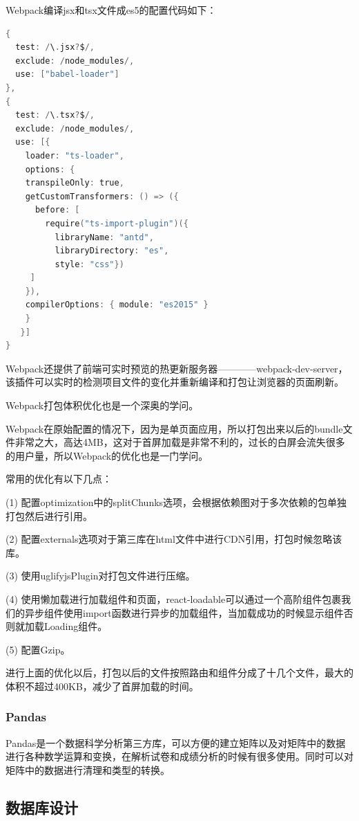 Webpack编译jsx和tsx文件成es5的配置代码如下：
\begin{lstlisting}[language=C]
{
  test: /\.jsx?$/,
  exclude: /node_modules/,
  use: ["babel-loader"]
},
{
  test: /\.tsx?$/,
  exclude: /node_modules/,
  use: [{
    loader: "ts-loader",
    options: {
    transpileOnly: true,
    getCustomTransformers: () => ({
      before: [
        require("ts-import-plugin")({
          libraryName: "antd",
          libraryDirectory: "es",
          style: "css"})
     ]
    }),
    compilerOptions: { module: "es2015" }
    }
   }]
}
\end{lstlisting}

Webpack还提供了前端可实时预览的热更新服务器————webpack-dev-server，该插件可以实时的检测项目文件的变化并重新编译和打包让浏览器的页面刷新。

Webpack打包体积优化也是一个深奥的学问。

Webpack在原始配置的情况下，因为是单页面应用，所以打包出来以后的bundle文件非常之大，高达4MB，这对于首屏加载是非常不利的，过长的白屏会流失很多的用户量，所以Webpack的优化也是一门学问。

常用的优化有以下几点：

(1) 配置optimization中的splitChunks选项，会根据依赖图对于多次依赖的包单独打包然后进行引用。

(2) 配置externals选项对于第三库在html文件中进行CDN引用，打包时候忽略该库。

(3) 使用uglifyjsPlugin对打包文件进行压缩。

(4) 使用懒加载进行加载组件和页面，react-loadable可以通过一个高阶组件包裹我们的异步组件使用import函数进行异步的加载组件，当加载成功的时候显示组件否则就加载Loading组件。

(5) 配置Gzip。

进行上面的优化以后，打包以后的文件按照路由和组件分成了十几个文件，最大的体积不超过400KB，减少了首屏加载的时间。

\subsubsection{Pandas}

Pandas是一个数据科学分析第三方库，可以方便的建立矩阵以及对矩阵中的数据进行各种数学运算和变换，在解析试卷和成绩分析的时候有很多使用。同时可以对矩阵中的数据进行清理和类型的转换。

\subsection{数据库设计}

